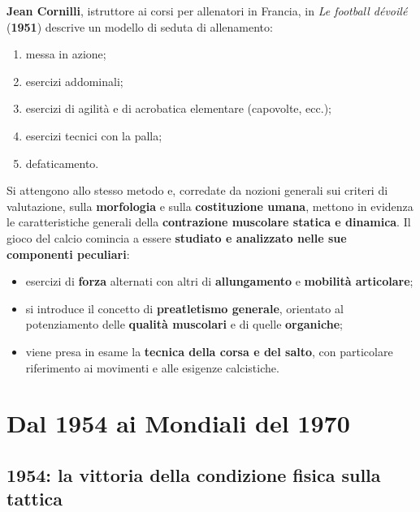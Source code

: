 \textbf{Jean Cornilli}, istruttore ai corsi per allenatori in Francia, in \textit{Le football
dévoilé} (\textbf{1951}) descrive un modello di seduta di allenamento:
\begin{enumerate}
  \item messa in azione;
  \item esercizi addominali;
  \item esercizi di agilità e di acrobatica elementare (capovolte, ecc.);
  \item esercizi tecnici con la palla;
  \item defaticamento.
\end{enumerate}

Si attengono allo stesso metodo e, corredate da nozioni generali sui criteri di valutazione, sulla
\textbf{morfologia} e sulla \textbf{costituzione umana}, mettono in evidenza le caratteristiche
generali della \textbf{contrazione muscolare statica e dinamica}. Il gioco del calcio comincia a
essere \textbf{studiato e analizzato nelle sue componenti peculiari}:
\begin{itemize}
  \item esercizi di \textbf{forza} alternati con altri di \textbf{allungamento} e
    \textbf{mobilità articolare};
  \item si introduce il concetto di \textbf{preatletismo generale}, orientato al potenziamento
    delle \textbf{qualità muscolari} e di quelle \textbf{organiche};
  \item viene presa in esame la \textbf{tecnica della corsa e del salto}, con particolare
    riferimento ai movimenti e alle esigenze calcistiche.
\end{itemize}

\section{Dal 1954 ai Mondiali del 1970}

\subsection{1954: la vittoria della condizione fisica sulla tattica}

